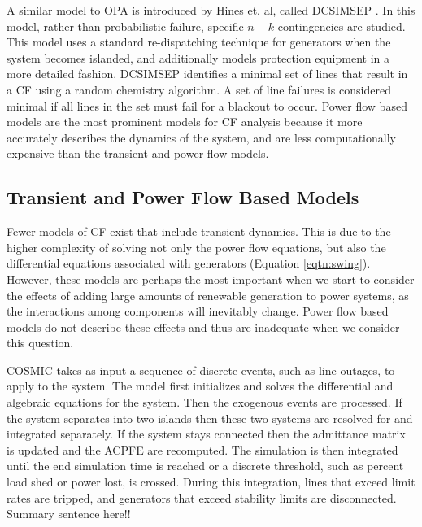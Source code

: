 A similar model to OPA is introduced by Hines et. al, called DCSIMSEP \cite{dual_graph}.  In this model, rather than probabilistic failure, specific $n-k$ contingencies are studied.  This model uses a standard re-dispatching technique for generators when the system becomes islanded, and additionally models protection equipment in a more detailed fashion.  DCSIMSEP identifies a minimal set of lines that result in a CF using a random chemistry algorithm.  A set of line failures is considered minimal if all lines in the set must fail for a blackout to occur.  Power flow based models are the most prominent models for CF analysis because it more accurately describes the dynamics of the system, and are less computationally expensive than the transient and power flow models.  
\subsection{Transient and Power Flow Based Models}

Fewer models of CF exist that include transient dynamics.  This is due to the higher complexity of solving not only the power flow equations, but also the differential equations associated with generators (Equation \ref{eqtn:swing}).  However, these models are perhaps the most important when we start to consider the effects of adding large amounts of renewable generation  to power systems, as the interactions among components will inevitably change.  Power flow based models do not describe these effects and thus are inadequate when we consider this question.


COSMIC \cite{cosmic} takes as input a sequence of discrete events, such as line outages, to apply to the system.  The model first initializes and solves the differential and algebraic equations for the system.    Then the exogenous events are processed.  If the system separates into two islands then these two systems are resolved for and integrated separately.  If the system stays connected then the admittance matrix is updated and the ACPFE are recomputed.  The simulation is then integrated until the end simulation time is reached or a discrete threshold, such as percent load shed or power lost, is crossed.  During this integration, lines that exceed limit rates are tripped, and generators that exceed stability limits are disconnected.  {\color{red} Summary sentence here!!}


